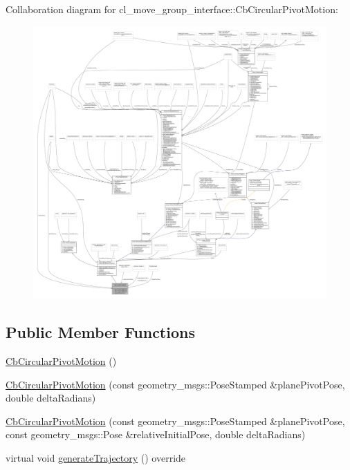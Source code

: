 Collaboration diagram for cl\+\_\+move\+\_\+group\+\_\+interface\+:\+:Cb\+Circular\+Pivot\+Motion\+:
\nopagebreak
\begin{figure}[H]
\begin{center}
\leavevmode
\includegraphics[width=350pt]{classcl__move__group__interface_1_1CbCircularPivotMotion__coll__graph}
\end{center}
\end{figure}
\subsection*{Public Member Functions}
\begin{DoxyCompactItemize}
\item 
\hyperlink{classcl__move__group__interface_1_1CbCircularPivotMotion_adbc4c7c67b9ba45fdb3cbb9fac950424}{Cb\+Circular\+Pivot\+Motion} ()
\item 
\hyperlink{classcl__move__group__interface_1_1CbCircularPivotMotion_a1ac3adbb2d973551a09ebd9229f5afec}{Cb\+Circular\+Pivot\+Motion} (const geometry\+\_\+msgs\+::\+Pose\+Stamped \&plane\+Pivot\+Pose, double delta\+Radians)
\item 
\hyperlink{classcl__move__group__interface_1_1CbCircularPivotMotion_aa92061fd53ae9d7971a6fe4f7b179ba2}{Cb\+Circular\+Pivot\+Motion} (const geometry\+\_\+msgs\+::\+Pose\+Stamped \&plane\+Pivot\+Pose, const geometry\+\_\+msgs\+::\+Pose \&relative\+Initial\+Pose, double delta\+Radians)
\item 
virtual void \hyperlink{classcl__move__group__interface_1_1CbCircularPivotMotion_a7ff4ffd989cda695adc44a5a42eb3a18}{generate\+Trajectory} () override
\end{DoxyCompactItemize}
